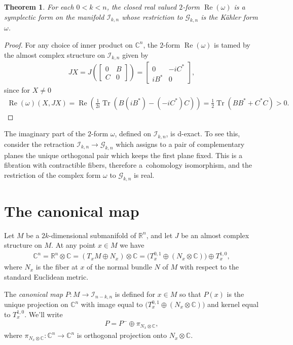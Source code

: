\documentclass[pdftex]{sigma}
\DeclareMathOperator{\Tr}{Tr}
\newtheorem{thm}{Theorem}[section]
\numberwithin{equation}{section}
\newcommand{\R}{\mathbb{R}}
\newcommand{\CC}{\mathbb{C}}
\newcommand{\cG}{{\mathcal G}}
\newcommand{\cI}{{\mathcal I}}
\begin{document}
\begin{thm}For each $0 < k < n$, the closed real valued $2$-form $\operatorname{Re}(\omega)$ is a symplectic form on the manifold $\cI_{k,n}$ whose restriction to $\cG_{k,n}$ is the K\"ahler form $\omega$.
\end{thm}

\begin{proof} For any choice of inner product on $\CC^n$, the $2$-form $\operatorname{Re}(\omega)$ is tamed by the almost complex structure on $\cI_{k,n}$ given by
\begin{gather*}
JX = J\left(
\begin{bmatrix}
0 & B \\
C & 0
\end{bmatrix}
\right)
=
\begin{bmatrix}
0 & -iC^* \\
iB^* & 0
\end{bmatrix},
\end{gather*}
since for $X\neq 0$
\begin{gather*}
\operatorname{Re}(\omega)(X,JX) = \operatorname{Re} \left ( \frac {1}{2i} \Tr ( B(iB^*) - (-iC^*)C) \right) = \frac 1 2 \Tr(BB^* + C^*C) > 0.\tag*{\qed}
\end{gather*} \renewcommand{\qed}{}
\end{proof}

The imaginary part of the $2$-form $\omega$, defined on $\cI_{k,n}$, is d-exact. To see this, consider the retraction $\cI_{k,n} \to \cG_{k,n}$ which assigns to a pair of complementary planes the unique orthogonal pair which keeps the first plane fixed. This is a fibration with contractible fibers, therefore a~cohomology isomorphism, and the restriction of the complex form $\omega$ to $\cG_{k,n}$ is real.

\section{The canonical map} \label{sec;Pmap}

\begin{defn}
Let $M$ be a $2k$-dimensional submanifold of $\R^n$, and let $J$ be an almost complex structure on $M$. At any point $x \in M$ we have
\begin{gather*}
\CC^n = \R^n \otimes \CC = ( T_x M \oplus N_x ) \otimes \CC = \big( T^{0,1}_x \oplus ( N_x \otimes \CC ) \big) \oplus T^{1,0}_x,
\end{gather*}
where $N_x$ is the fiber at $x$ of the normal bundle $N$ of $M$ with respect to the standard Euclidean metric.

The \emph{canonical map} $P\colon M \to \cI_{n-k,n}$ is defined for $x \in M$ so that $P(x)$ is the unique projection on $\CC^n$ with image equal to $\big( T^{0,1}_x \oplus ( N_x \otimes \CC) \big)$ and kernel equal to $T^{1,0}_x$. We'll write
\begin{gather*}
P = P^- \oplus \pi_{N_x \otimes \CC},
\end{gather*}
where $\pi_{N_x \otimes \CC}\colon \CC^n \to \CC^n$ is orthogonal projection onto $N_x \otimes \CC$.
\end{defn}
\end{document}
